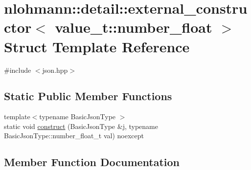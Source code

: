 \hypertarget{structnlohmann_1_1detail_1_1external__constructor_3_01value__t_1_1number__float_01_4}{}\section{nlohmann\+::detail\+::external\+\_\+constructor$<$ value\+\_\+t\+::number\+\_\+float $>$ Struct Template Reference}
\label{structnlohmann_1_1detail_1_1external__constructor_3_01value__t_1_1number__float_01_4}


{\ttfamily \#include $<$json.\+hpp$>$}

\subsection*{Static Public Member Functions}
\begin{DoxyCompactItemize}
\item 
{\footnotesize template$<$typename Basic\+Json\+Type $>$ }\\static void \mbox{\hyperlink{structnlohmann_1_1detail_1_1external__constructor_3_01value__t_1_1number__float_01_4_a669df5a4d258b588e67f747c6d656cdb}{construct}} (Basic\+Json\+Type \&j, typename Basic\+Json\+Type\+::number\+\_\+float\+\_\+t val) noexcept
\end{DoxyCompactItemize}


\subsection{Member Function Documentation}
\mbox{\label{structnlohmann_1_1detail_1_1external__constructor_3_01value__t_1_1number__float_01_4_a669df5a4d258b588e67f747c6d656cdb}} 
